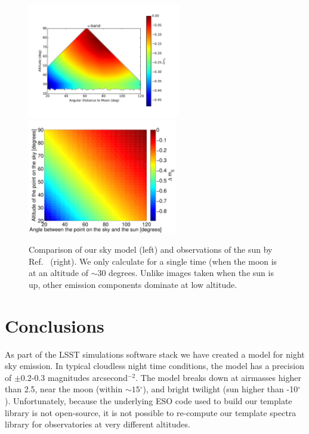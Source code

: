 \documentclass[]{spie}
\newcommand\degree{{^\circ}}
\begin{document}
\begin{figure}
  \begin{center}
  \includegraphics[height=5cm]{plots/deltam5.pdf}\includegraphics[height=5cm]{plots/a1_alt_angle_meshgrid.pdf}
  \end{center}
  \caption{ Comparison of our sky model (left) and observations of the sun by Ref.~ (right).  We only calculate for a single time (when the moon is at an altitude of $\sim 30$ degrees. Unlike images taken when the sun is up, other emission components dominate at low altitude.  \label{fig:cCompare}}
\end{figure}

\section{Conclusions}

As part of the LSST simulations software stack we have created a model for night sky emission.  In typical cloudless night time conditions, the model has a precision of $\pm$0.2-0.3 magnitudes arcsecond$^{-2}$. The model breaks down at airmasses higher than 2.5, near the moon (within $\sim15\degree$), and bright twilight (sun higher than -10$\degree$).  Unfortunately, because the underlying ESO code used to build our template library is not open-source, it is not possible to re-compute our template spectra library for observatories at very different altitudes.  



\end{document}
